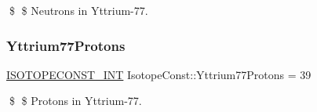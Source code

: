 \$ \$ Neutrons in Yttrium-\/77. \mbox{\label{group___isotope_const-_yttrium-_y77_ga4b8574f0391eda87818aa156e08ab194}} 
\subsubsection{\texorpdfstring{Yttrium77\+Protons}{Yttrium77Protons}}
{\footnotesize\ttfamily \mbox{\hyperlink{group___isotope_const-_macros_ga5f18360b3e99483a35c32d789e62621c}{I\+S\+O\+T\+O\+P\+E\+C\+O\+N\+S\+T\+\_\+\+I\+NT}} Isotope\+Const\+::\+Yttrium77\+Protons = 39}

\$ \$ Protons in Yttrium-\/77. 